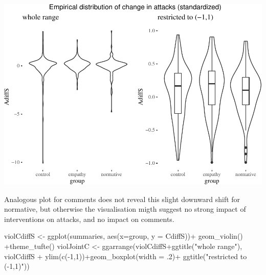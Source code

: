 \documentclass[
  10pt,
  dvipsnames,enabledeprecatedfontcommands]{scrartcl}
\newenvironment{Shaded}{\begin{snugshade}}{\end{snugshade}}
\newcommand{\AttributeTok}[1]{\textcolor[rgb]{0.77,0.63,0.00}{#1}}
\newcommand{\DecValTok}[1]{\textcolor[rgb]{0.00,0.00,0.81}{#1}}
\newcommand{\FunctionTok}[1]{\textcolor[rgb]{0.00,0.00,0.00}{#1}}
\newcommand{\NormalTok}[1]{#1}
\newcommand{\OtherTok}[1]{\textcolor[rgb]{0.56,0.35,0.01}{#1}}
\newcommand{\SpecialCharTok}[1]{\textcolor[rgb]{0.00,0.00,0.00}{#1}}
\newcommand{\StringTok}[1]{\textcolor[rgb]{0.31,0.60,0.02}{#1}}
\begin{document}
\begin{center}\includegraphics[width=1\linewidth]{bayesianReport3_files/figure-latex/violEmpiricalAdiff-1} \end{center}
\normalsize

Analogous plot for comments does not reveal this slight downward shift
for normative, but otherwise the visualisation migth suggest no strong
impact of interventions on attacks, and no impact on comments.

\vspace{1mm}
\footnotesize

\begin{Shaded}
\begin{Highlighting}[]
\NormalTok{violCdiffS }\OtherTok{\textless{}{-}} \FunctionTok{ggplot}\NormalTok{(summaries, }\FunctionTok{aes}\NormalTok{(}\AttributeTok{x=}\NormalTok{group, }\AttributeTok{y =}\NormalTok{ CdiffS))}\SpecialCharTok{+}
  \FunctionTok{geom\_violin}\NormalTok{() }\SpecialCharTok{+}\FunctionTok{theme\_tufte}\NormalTok{() }
\NormalTok{violJointC }\OtherTok{\textless{}{-}} \FunctionTok{ggarrange}\NormalTok{(violCdiffS}\SpecialCharTok{+}\FunctionTok{ggtitle}\NormalTok{(}\StringTok{"whole range"}\NormalTok{),}
\NormalTok{              violCdiffS }\SpecialCharTok{+} \FunctionTok{ylim}\NormalTok{(}\FunctionTok{c}\NormalTok{(}\SpecialCharTok{{-}}\DecValTok{1}\NormalTok{,}\DecValTok{1}\NormalTok{))}\SpecialCharTok{+}\FunctionTok{geom\_boxplot}\NormalTok{(}\AttributeTok{width =}\NormalTok{ .}\DecValTok{2}\NormalTok{)}\SpecialCharTok{+}
              \FunctionTok{ggtitle}\NormalTok{(}\StringTok{"restricted to ({-}1,1)"}\NormalTok{)) }
\end{Highlighting}
\end{Shaded}
\end{document}
